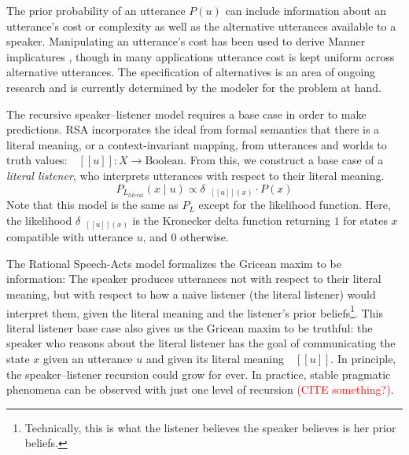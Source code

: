 \documentclass[12pt,letterpaper]{article}
\newcommand{\denote}[1]{\mbox{ $[\![ #1 ]\!]$}}
\newcommand{\red}[1]{\textcolor{Red}{#1}}
\begin{document}
The prior probability of an utterance $P(u)$ can include information about an utterance's cost or complexity as well as the alternative utterances available to a speaker. 
Manipulating an utterance's cost has been used to derive Manner implicatures \cite{Bergen2016}, though in many applications utterance cost is kept uniform across alternative utterances. 
The specification of alternatives is an area of ongoing research \cite{Franke2014cogsci, Peloquin2016} and is currently determined by the modeler for the problem at hand.

The recursive speaker--listener model requires a base case in order to make predictions. 
RSA incorporates the ideal from formal semantics that there is a literal meaning, or a context-invariant mapping, from utterances and worlds to truth values:  $\denote{u}: X \rightarrow \text{Boolean}$. 
From this, we construct a base case of a \emph{literal listener}, who interprets utterances with respect to their literal meaning.
%
$$
P_{L_{literal}}(x \mid u ) \propto {\delta_{\denote{u}(x)} \cdot P(x)} \label{eq:RSA_L0}
$$
Note that this model is the same as $P_L$ except for the likelihood function. 
%
Here, the likelihood $\delta_{\denote{u}(x)}$ is the Kronecker delta function returning $1$ for states $x$ compatible with utterance $u$, and $0$ otherwise.

The Rational Speech-Acts model formalizes the Gricean maxim to be information: The speaker produces utterances not with respect to their literal meaning, but with respect to how a naive listener (the literal listener) would interpret them, given the literal meaning and the listener's prior beliefs\footnote{Technically, this is what the listener believes the speaker believes is her prior beliefs.}.
This literal listener base case also gives us the Gricean maxim to be truthful: the speaker who reasons about the literal listener has the goal of communicating the state $x$ given an utterance $u$ and given its literal meaning $\denote{u}$. 
In principle, the speaker--listener recursion could grow for ever. 
In practice, stable pragmatic phenomena can be observed with just one level of recursion \red{(CITE something?)}. 
\end{document}
